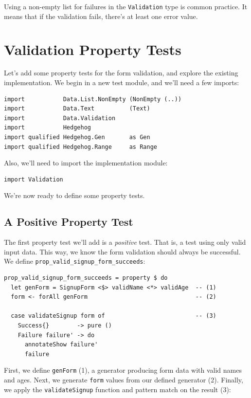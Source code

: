 Using a non-empty list for failures in the \texttt{Validation} type is
common practice. It means that if the validation fails, there's at least
one error value.

\section{Validation Property Tests}\label{validation-property-tests}

Let's add some property tests for the form validation, and explore the
existing implementation. We begin in a new test module, and we'll need a
few imports:

\begin{verbatim}
import           Data.List.NonEmpty (NonEmpty (..))
import           Data.Text          (Text)
import           Data.Validation
import           Hedgehog
import qualified Hedgehog.Gen       as Gen
import qualified Hedgehog.Range     as Range
\end{verbatim}
Also, we'll need to import the implementation module:

\begin{verbatim}
import Validation
\end{verbatim}
We're now ready to define some property tests.

\subsection{A Positive Property
Test}\label{a-positive-property-test}

The first property test we'll add is a \emph{positive} test. That is, a
test using only valid input data. This way, we know the form validation
should always be successful. We define
\texttt{prop\_valid\_signup\_form\_succeeds}:

\begin{verbatim}
prop_valid_signup_form_succeeds = property $ do
  let genForm = SignupForm <$> validName <*> validAge  -- (1)
  form <- forAll genForm                               -- (2)

  case validateSignup form of                          -- (3)
    Success{}        -> pure ()
    Failure failure' -> do
      annotateShow failure'
      failure
\end{verbatim}
First, we define \texttt{genForm} (1), a generator producing form data
with valid names and ages. Next, we generate \texttt{form} values from
our defined generator (2). Finally, we apply the \texttt{validateSignup}
function and pattern match on the result (3):

